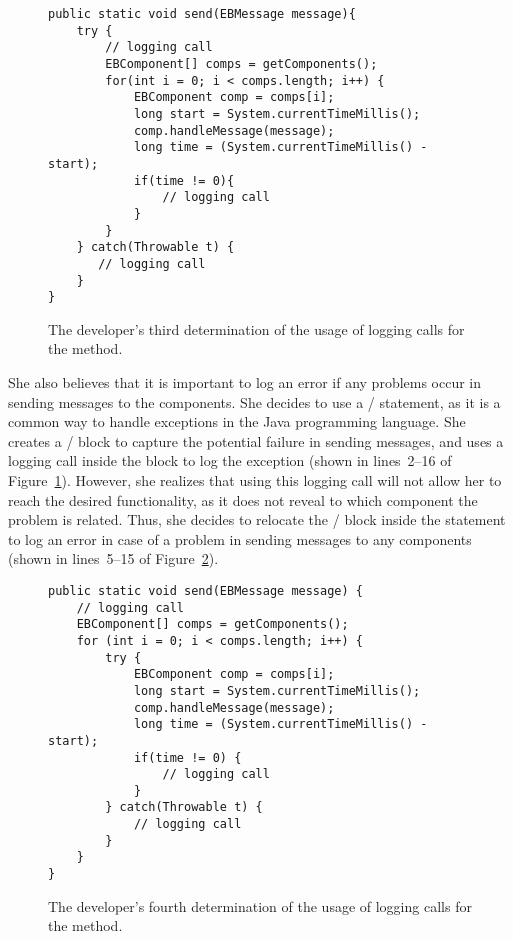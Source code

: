 \begin{figure}[p]
\def\baselinestretch{1}
\begin{lstlisting}
public static void send(EBMessage message){
    try {
        // logging call
        EBComponent[] comps = getComponents();
        for(int i = 0; i < comps.length; i++) {
            EBComponent comp = comps[i];
            long start = System.currentTimeMillis();
            comp.handleMessage(message);
            long time = (System.currentTimeMillis() - start);
            if(time != 0){
                // logging call
            }
        }
    } catch(Throwable t) {
       // logging call
    }
}
\end{lstlisting}
\caption[The developer's third determination of the usage of logging calls.]{The developer's third determination of the usage of logging calls for the  method.\label{ch2-ex-logged-m3}}
\end{figure}

She also believes that it is important to log an error if any problems occur in sending messages to the components. She decides to use a / statement, as it is a common way to handle exceptions in the Java programming language. She creates a / block to capture the potential failure in sending messages, and uses a logging call inside the  block to log the exception (shown in lines~2--16 of Figure~\ref{ch2-ex-logged-m3}). However, she realizes that using this logging call will not allow her to reach the desired functionality, as it does not reveal to which component the problem is related. Thus, she decides to relocate the / block inside the  statement to log an error in case of a problem in sending messages to any components (shown in lines~5--15 of Figure~\ref{ch2-ex-logged-m4}).


\begin{figure}[p]
\def\baselinestretch{1}
\begin{lstlisting}
public static void send(EBMessage message) {
    // logging call
    EBComponent[] comps = getComponents();
    for (int i = 0; i < comps.length; i++) {
        try {
            EBComponent comp = comps[i];
            long start = System.currentTimeMillis();
            comp.handleMessage(message);
            long time = (System.currentTimeMillis() - start);
            if(time != 0) {
                // logging call
            }
        } catch(Throwable t) {
            // logging call
        }
    }
}
\end{lstlisting}
\caption[The developer's fourth determination of the usage of logging calls.]{The developer's fourth determination of the usage of logging calls for the  method.\label{ch2-ex-logged-m4}}
\end{figure}

